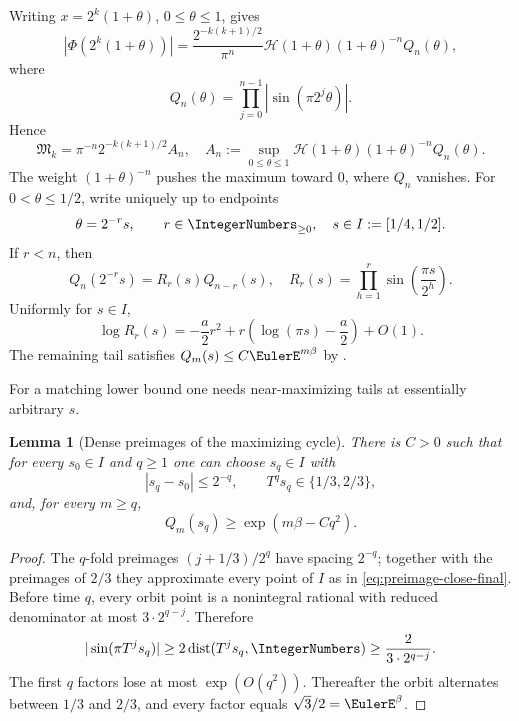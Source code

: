 \documentclass[11pt,oneside]{article}
\newtheorem{lemma}[lemma]{Lemma}
\theoremstyle{definition}
\theoremstyle{remark}
\newcommand{\Phiup}{\Phi}
\begin{document}
Writing $x=2^k(1+\theta)$, $0\le\theta\le1$, gives
\begin{equation}
 |\Phiup(2^k(1+\theta))|
 =\frac{2^{-k(k+1)/2}}{\pi^n}
 \mathcal H(1+\theta)(1+\theta)^{-n}Q_n(\theta),
 \label{eq:annular-exact-final}
\end{equation}
where
\[
 Q_n(\theta)=\prod_{j=0}^{n-1}|\sin(\pi2^j\theta)|.
\]
Hence
\begin{equation}
 \mathfrak M_k=\pi^{-n}2^{-k(k+1)/2}A_n,
 \quad
 A_n:=\sup_{0\le\theta\le1}
 \mathcal H(1+\theta)(1+\theta)^{-n}Q_n(\theta).
 \label{eq:An-final}
\end{equation}
The weight $(1+\theta)^{-n}$ pushes the maximum toward $0$, where $Q_n$ vanishes.
For $0<\theta\le1/2$, write uniquely up to endpoints
\begin{equation}
 \theta=2^{-r}s,
 \qquad r\in\IntegerNumbers_{\ge0},\quad s\in I:=[1/4,1/2].
 \label{eq:transition-final}
\end{equation}
If $r<n$, then
\begin{equation}
 Q_n(2^{-r}s)=R_r(s)Q_{n-r}(s),
 \quad
 R_r(s)=\prod_{h=1}^{r}\sin\!\left(\frac{\pi s}{2^h}\right).
 \label{eq:transition-product-final}
\end{equation}
Uniformly for $s\in I$,
\begin{equation}
 \log R_r(s)
 =-\frac a2r^2+r\left(\log(\pi s)-\frac a2\right)+O(1).
 \label{eq:small-block-final}
\end{equation}
The remaining tail satisfies $Q_m(s)\le C\EulerE^{m\beta}$ by
.

For a matching lower bound one needs near-maximizing tails at essentially arbitrary $s$.

\begin{lemma}[Dense preimages of the maximizing cycle]
\label{lem:dense-preimages-final}
There is $C>0$ such that for every $s_0\in I$ and $q\ge1$ one can choose $s_q\in I$ with
\begin{equation}
 |s_q-s_0|\le2^{-q},
 \qquad T^qs_q\in\{1/3,2/3\},
 \label{eq:preimage-close-final}
\end{equation}
and, for every $m\ge q$,
\begin{equation}
 Q_m(s_q)\ge\exp(m\beta-Cq^2).
 \label{eq:preimage-lower-final}
\end{equation}
\end{lemma}

\begin{proof}
The $q$-fold preimages $(j+1/3)/2^q$ have spacing $2^{-q}$; together with the preimages of
$2/3$ they approximate every point of $I$ as in \eqref{eq:preimage-close-final}.  Before
time $q$, every orbit point is a nonintegral rational with reduced denominator at most
$3\cdot2^{q-j}$.  Therefore
\[
 |\sin(\pi T^js_q)|\ge2\operatorname{dist}(T^js_q,\IntegerNumbers)
 \ge\frac{2}{3\cdot2^{q-j}}.
\]
The first $q$ factors lose at most $\exp(O(q^2))$.  Thereafter the orbit alternates between
$1/3$ and $2/3$, and every factor equals $\sqrt3/2=\EulerE^\beta$.
\end{proof}
\end{document}
